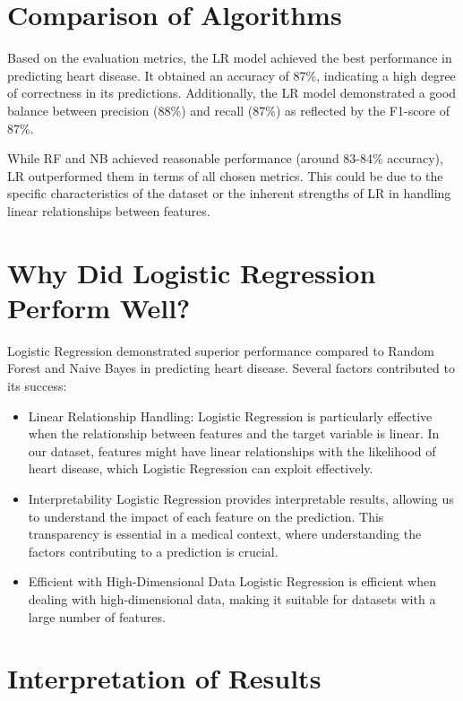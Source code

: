\section{Comparison of Algorithms}
Based  on the evaluation metrics, the LR model achieved the best performance in predicting heart disease. It obtained an accuracy of 87\%, indicating a high degree of correctness in its predictions. Additionally, the LR model demonstrated a good balance between precision (88\%) and recall (87\%) as reflected by the F1-score of 87\%.

While RF and NB achieved reasonable performance (around 83-84\% accuracy), LR outperformed them in terms of all chosen metrics. This could be due to the specific characteristics of the dataset or the inherent strengths of LR in handling linear relationships between features.


\section{Why Did Logistic Regression Perform Well?}
Logistic Regression demonstrated superior performance compared to Random Forest and Naive Bayes in predicting heart disease. Several factors contributed to its success:

\begin{itemize}
    \item Linear Relationship Handling: Logistic Regression is particularly effective when the relationship between features and the target variable is linear. In our dataset, features might have linear relationships with the likelihood of heart disease, which Logistic Regression can exploit effectively.
    
    \item Interpretability Logistic Regression provides interpretable results, allowing us to understand the impact of each feature on the prediction. This transparency is essential in a medical context, where understanding the factors contributing to a prediction is crucial.
    
    \item Efficient with High-Dimensional Data Logistic Regression is efficient when dealing with high-dimensional data, making it suitable for datasets with a large number of features.
\end{itemize}

\section{Interpretation of Results}

